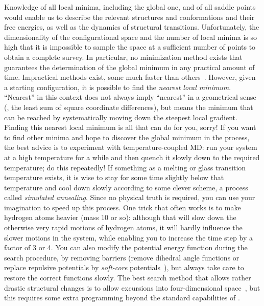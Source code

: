 Knowledge of all local minima, including the global one, and of all
saddle points would enable us to describe the relevant structures and
conformations and their free energies, as well as the dynamics of
structural transitions. Unfortunately, the dimensionality of the
configurational space and the number of local minima is so high that
it is impossible to sample the space at a sufficient number of points
to obtain a complete survey. In particular, no minimization method
exists that guarantees the determination of the global minimum in any
practical amount of time. Impractical methods exist, some much faster
than others~\cite{Geman84}.  However, given a starting configuration,
it is possible to find the {\em nearest local minimum}. ``Nearest'' in
this context does not always imply ``nearest'' in a geometrical sense
({\ie}, the least sum of square coordinate differences), but means the
minimum that can be reached by systematically moving down the steepest
local gradient. Finding this nearest local minimum is all that
{\gromacs} can do for you, sorry! If you want to find other minima and
hope to discover the global minimum in the process, the best advice is
to experiment with temperature-coupled MD: run your system at a high
temperature for a while and then quench it slowly down to the required
temperature; do this repeatedly!  If something as a melting or glass
transition temperature exists, it is wise to stay for some time
slightly below that temperature and cool down slowly according to some
clever scheme, a process called {\em simulated annealing}. Since no
physical truth is required, you can use your imagination to speed up this
process. One trick that often works is to make hydrogen atoms heavier
(mass 10 or so): although that will slow down the otherwise very rapid
motions of hydrogen atoms, it will hardly influence the slower motions
in the system, while enabling you to increase the time step by a factor
of 3 or 4. You can also modify the potential energy function during
the search procedure, {\eg} by removing barriers (remove dihedral
angle functions or replace repulsive potentials by {\em soft-core}
potentials~\cite{Nilges88}), but always take care to restore the
correct functions slowly. The best search method that allows rather
drastic structural changes is to allow excursions into
four-dimensional space~\cite{Schaik93}, but this requires some extra
programming beyond the standard capabilities of {\gromacs}.

